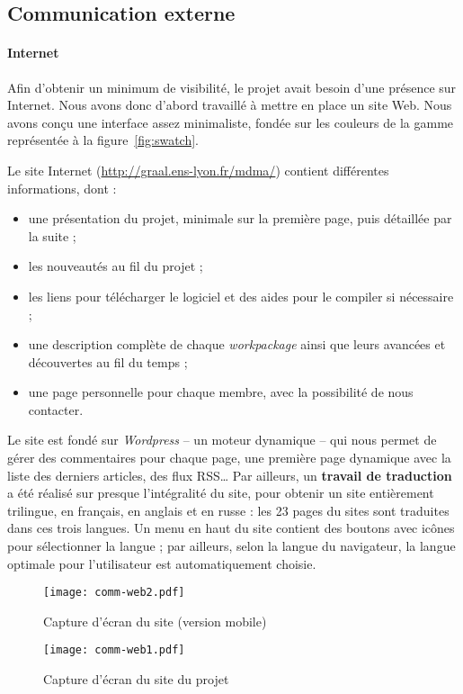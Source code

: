\subsection{Communication externe}
\paragraph{Internet}
\par Afin d'obtenir un minimum de visibilité, le projet avait besoin d'une présence sur Internet. Nous avons donc d'abord travaillé à mettre en place un site Web. Nous avons conçu une interface assez minimaliste, fondée sur les couleurs de la gamme représentée à la figure~\ref{fig:swatch}.
\par Le site Internet (\url{http://graal.ens-lyon.fr/mdma/}) contient différentes informations, dont :
\begin{itemize}
  \item une présentation du projet, minimale sur la première page, puis détaillée par la suite ;
  \item les nouveautés au fil du projet ;
  \item les liens pour télécharger le logiciel et des aides pour le compiler si nécessaire ;
  \item une description complète de chaque \emph{workpackage} ainsi que leurs avancées et découvertes au fil du temps ;
  \item une page personnelle pour chaque membre, avec la possibilité de nous contacter.
\end{itemize}
\par Le site est fondé sur \emph{Wordpress} -- un moteur dynamique -- qui nous permet de gérer des commentaires pour chaque page, une première page dynamique avec la liste des derniers articles, des flux RSS… Par ailleurs, un \textbf{travail de traduction} a été réalisé sur presque l'intégralité du site, pour obtenir un site entièrement trilingue, en français, en anglais et en russe : les 23 pages du sites sont traduites dans ces trois langues. Un menu en haut du site contient des boutons avec icônes pour sélectionner la langue ; par ailleurs, selon la langue du navigateur, la langue optimale pour l'utilisateur est automatiquement choisie.
\begin{figure}[h]
  \centering
    \texttt{[image: comm-web2.pdf]}
  \caption{Capture d'écran du site (version mobile)}
\end{figure}
\begin{figure}[h]
  \centering
    \texttt{[image: comm-web1.pdf]}
  \caption{Capture d'écran du site du projet}
\end{figure}
